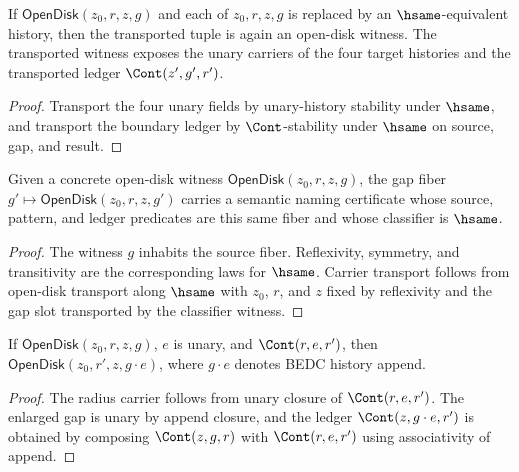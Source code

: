 \begin{lemma}
\label{lem:holomorphic-open-disk-hsame-transport}
If \(\mathsf{OpenDisk}(z_0,r,z,g)\) and each of \(z_0,r,z,g\) is replaced by an \(\hsame\)-equivalent history, then the transported tuple is again an open-disk witness. The transported witness exposes the unary carriers of the four target histories and the transported ledger \(\Cont(z',g',r')\).
\end{lemma}
\begin{proof}
Transport the four unary fields by unary-history stability under \(\hsame\), and transport the boundary ledger by \(\Cont\)-stability under \(\hsame\) on source, gap, and result.
\end{proof}

\begin{theorem}
\label{thm:holomorphic-open-disk-gap-semantic-namecert}
Given a concrete open-disk witness \(\mathsf{OpenDisk}(z_0,r,z,g)\), the gap fiber \(g' \mapsto \mathsf{OpenDisk}(z_0,r,z,g')\) carries a semantic naming certificate whose source, pattern, and ledger predicates are this same fiber and whose classifier is \(\hsame\).
\end{theorem}
\begin{proof}
The witness \(g\) inhabits the source fiber. Reflexivity, symmetry, and transitivity are the corresponding laws for \(\hsame\). Carrier transport follows from open-disk transport along \(\hsame\) with \(z_0\), \(r\), and \(z\) fixed by reflexivity and the gap slot transported by the classifier witness.
\end{proof}

\begin{lemma}
\label{lem:holomorphic-open-disk-radius-extension-closed}
If \(\mathsf{OpenDisk}(z_0,r,z,g)\), \(e\) is unary, and \(\Cont(r,e,r')\), then \(\mathsf{OpenDisk}(z_0,r',z,g \cdot e)\), where \(g \cdot e\) denotes BEDC history append.
\end{lemma}
\begin{proof}
The radius carrier follows from unary closure of \(\Cont(r,e,r')\). The enlarged gap is unary by append closure, and the ledger \(\Cont(z,g \cdot e,r')\) is obtained by composing \(\Cont(z,g,r)\) with \(\Cont(r,e,r')\) using associativity of append.
\end{proof}

